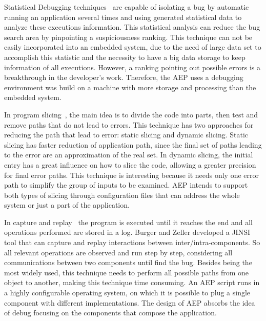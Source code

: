 \documentclass[conference]{IEEEtran}
\begin{document}
Statistical Debugging techniques~\cite{zheng2006statistical,zhang2009capturing,parsa2011statistical} are capable of isolating a bug by automatic running an application several times and using generated statistical data to analyze these executions information. This statistical analysis can reduce the bug search area by pinpointing a suspiciousness ranking. This technique can not be easily incorporated into an embedded system, due to the need of large data set to accomplish this statistic and the necessity to have a big data storage to keep information of all executions. However, a ranking pointing out possible errors is a breakthrough in the developer's work. Therefore, the AEP uses a debugging environment was build on a machine with more storage and processing than the embedded system.

In program slicing~\cite{sasirekha2011program, Xu:2005:BSP:1050849.1050865,artho2011iterative}, the main idea is to divide the code into parts, then test and remove paths that do not lead to errors. This technique has two approaches for reducing the path that lead to error: static slicing and dynamic slicing. Static slicing has faster reduction of application path, since the final set of paths leading to the error are an approximation of the real set. In dynamic slicing, the initial entry has a great influence on how to slice the code, allowing a greater precision for final error paths. This technique is interesting because it needs only one error path to simplify the group of inputs to be examined. AEP intends to support both types of slicing through configuration files that can address the whole system or just a  part of the application.

In capture and replay~\cite{burger2008replaying,qi2011locating,orso2005selective} the program is executed until it reaches the end and all operations performed are stored in a log. Burger and Zeller developed a JINSI tool that can capture and replay interactions between inter/intra-components. So  all relevant operations are observed and run step by step, considering all communications between two components until find the bug. Besides being the most widely used, this technique needs to perform all possible paths from one object to another, making this technique time consuming. An AEP script runs in a highly configurable operating system, on which  it is possible to plug a single component with different implementations. The design of AEP absorbs the idea of debug focusing on the components that compose the application.
\end{document}
